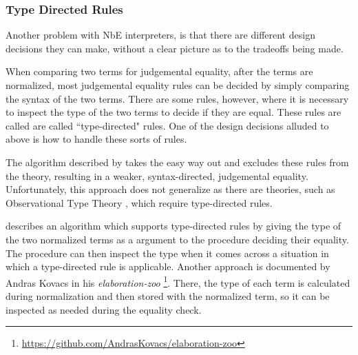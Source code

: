 \documentclass{article}
\begin{document}

\subsubsection{Type Directed Rules}


Another problem with NbE interpreters, is that there are different design decisions they can make, without a clear picture as to the tradeoffs being made.

When comparing two terms for judgemental equality, after the terms are normalized, most judgemental equality rules can be decided by simply comparing the syntax of the two terms.
There are some rules, however, where it is necessary to inspect the type of the two terms to decide if they are equal.
These rules are called are called ``type-directed" rules.
One of the design decisions alluded to above is how to handle these sorts of rules.

The algorithm described by \citet{Coquand1996} takes the easy way out and excludes these rules from the theory, resulting in a weaker, syntax-directed, judgemental equality.
Unfortunately, this approach does not generalize as there are theories, such as Observational Type Theory \citep{Altenkirch2007}, which require type-directed rules.

\citet{Chapman2005} describes an algorithm which supports type-directed rules by giving the type of the two normalized terms as a argument to the procedure deciding their equality.
The procedure can then inspect the type when it comes across a situation in which a type-directed rule is applicable.
Another approach is documented by Andras Kovacs in his \textit{elaboration-zoo} \footnote{\url{https://github.com/AndrasKovacs/elaboration-zoo}}.
There, the type of each term is calculated during normalization and then stored with the normalized term, so it can be inspected as needed during the equality check.
\end{document}
